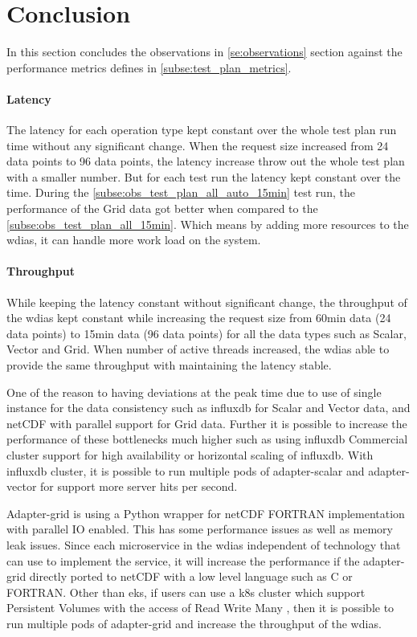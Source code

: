\section{Conclusion}

In this section concludes the observations in \ref{se:observations} section against the performance metrics defines in \ref{subse:test_plan_metrics}.

\paragraph{Latency}
The latency for each operation type kept constant over the whole test plan run time without any significant change. When the request size increased from 24 data points to 96 data points, the latency increase throw out the whole test plan with a smaller number. But for each test run the latency kept constant over the time.
During the \ref{subse:obs_test_plan_all_auto_15min} test run, the performance of the Grid data got better when compared to the \ref{subse:obs_test_plan_all_15min}. Which means by adding more resources to the \acrshort{wdias}, it can handle more work load on the system.

\paragraph{Throughput}
While keeping the latency constant without significant change, the throughput of the \acrshort{wdias} kept constant while increasing the request size from 60min data (24 data points) to 15min data (96 data points) for all the data types such as Scalar, Vector and Grid.
When number of active threads increased, the \acrshort{wdias} able to provide the same throughput with maintaining the latency stable.

One of the reason to having deviations at the peak time due to use of single instance for the data consistency such as \acrshort{influxdb} for Scalar and Vector data, and netCDF with parallel support for Grid data. Further it is possible to increase the performance of these bottlenecks much higher such as using \acrshort{influxdb} Commercial cluster support for high availability or horizontal scaling of \acrshort{influxdb}. With \acrshort{influxdb} cluster, it is possible to run multiple pods of adapter-scalar and adapter-vector for support more server hits per second.

Adapter-grid is using a Python wrapper for netCDF FORTRAN implementation with parallel IO enabled. This has some performance issues as well as memory leak issues. Since each microservice in the \acrshort{wdias} independent of technology that can use to implement the service, it will increase the performance if the adapter-grid directly ported to netCDF with a low level language such as C or FORTRAN.
Other than \acrshort{eks}, if users can use a \acrshort{k8s} cluster which support Persistent Volumes with the access of Read Write  Many \cite{LinuxFoundationPersistentKubernetes} , then it is possible to run multiple pods of adapter-grid and increase the throughput of the \acrshort{wdias}.

